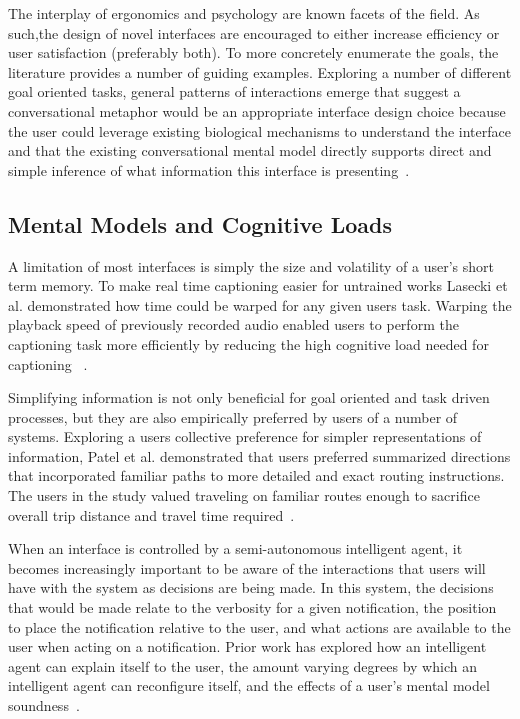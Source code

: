 The interplay of ergonomics and psychology are known facets of the field. As 
such,the design of novel interfaces are encouraged to either increase 
efficiency or user satisfaction (preferably both). To more concretely enumerate
the goals, the literature provides a number of guiding examples.  Exploring a
number of different goal oriented tasks, general patterns of interactions emerge
that suggest a conversational metaphor would be an appropriate interface design
choice because the user could leverage existing biological mechanisms to
understand the interface and that the existing conversational mental model
directly supports direct and simple inference of what information this
interface is presenting~\cite{kieras1984role}.

\subsection{                  Mental Models and Cognitive Loads              }

A limitation of most interfaces is simply the size and volatility of a user's
short term memory.  To make real time captioning easier for untrained works
Lasecki et al. demonstrated how time could be warped for any given users task.
Warping the playback speed of previously recorded audio enabled users to perform
the captioning task more efficiently by reducing the high cognitive load needed
for captioning ~\cite{lasecki2013warping}.

Simplifying information is not only beneficial for goal oriented and task driven
processes, but they are also empirically preferred by users of a number of
systems. Exploring a users collective preference for simpler  representations of
information, Patel et al. demonstrated that users preferred summarized
directions that incorporated familiar paths to more detailed and exact routing
instructions. The users in the study valued traveling on  familiar routes enough
to sacrifice overall trip distance and travel time
required~\cite{patel2006personalizing}.

When an interface is controlled by a semi-autonomous intelligent agent, it
becomes increasingly important to be aware of the interactions that users will
have with the system as decisions are being made.  In this system, the
decisions that would be made relate to the verbosity for a given notification,
the position to place the notification relative to the user, and what actions
are available to the user when acting on a notification.  Prior work has
explored how an intelligent agent can explain itself to the user, the amount
varying degrees by which an intelligent agent can reconfigure itself, and the
effects of a user's mental model soundness~\cite{kulesza2012tell}.

